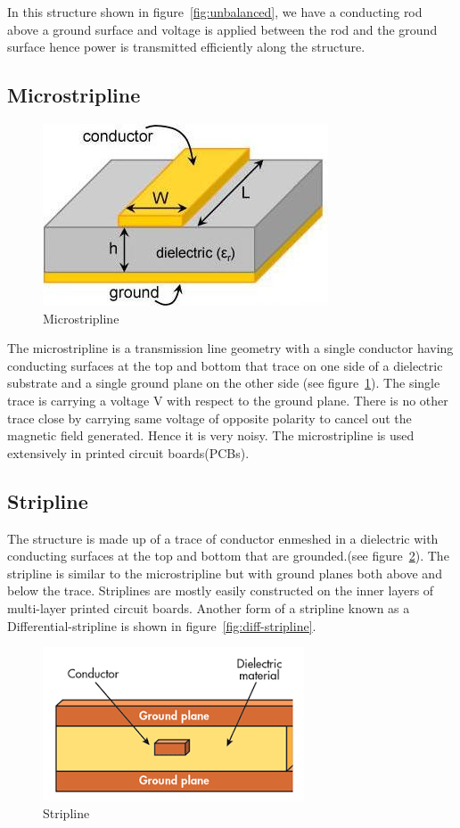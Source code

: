 In this structure shown in figure~\ref{fig:unbalanced}, we have a conducting rod above a ground surface and voltage is applied between the rod and the ground surface hence power is transmitted efficiently along the structure.

\subsection{Microstripline}
\begin{figure}[h]
\centering
\includegraphics[scale=0.6]{./graphics/ms (1)}
\caption{Microstripline}
\label{fig:micro}
\end{figure}

The microstripline is a transmission line geometry with a single conductor having conducting surfaces at the top and bottom that trace on one side of a dielectric substrate and a single ground plane on the other side (see figure~\ref{fig:micro}). The single trace is carrying a voltage V with respect to the ground plane. There is no other trace close by carrying same voltage of opposite polarity to cancel out the magnetic field generated. Hence it is very noisy. The microstripline is used extensively in printed circuit boards(PCBs).


\subsection{Stripline} 
The structure is made up of a trace of conductor enmeshed in a dielectric with conducting surfaces at the top and bottom that are grounded.(see figure~\ref{fig:stripline}). The stripline is similar to the microstripline but with ground planes both above and below the trace. Striplines are mostly easily constructed on the inner layers of multi-layer printed circuit boards. Another form of a stripline known as a Differential-stripline is shown in figure~\ref{fig:diff-stripline}.
\begin{figure}[h]
\centering
\includegraphics[scale=0.6]{./graphics/micro}
\caption{ Stripline}
\label{fig:stripline}
\end{figure}

